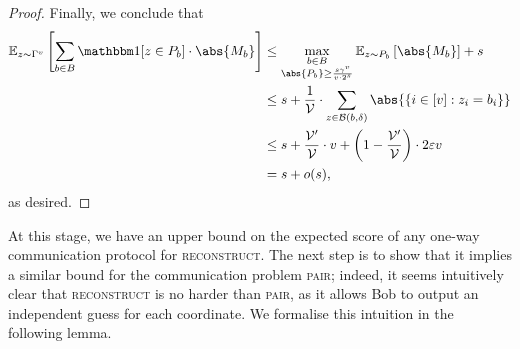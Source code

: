 \documentclass[10pt,a4paper]{article}
\theoremstyle{definition}
\newcommand{\E}{\mathbb E}
\renewcommand{\set}[1]{\left\{#1\right\}}
\newcommand{\eps}{\varepsilon}
\newcommand{\pair}{\normalfont\textsc{pair}\xspace}
\newcommand{\reconstruct}{\normalfont\textsc{reconstruct}\xspace}
\newcommand{\vcommitlength}{v}
\newcommand{\vcommitstring}{z}
\newcommand{\ball}{\mathcal B}
\newcommand{\alphabet}{\Gamma}
\newcommand{\alphabetsize}{\gamma}
\newcommand{\chf}{\mathbbm 1}
\begin{document}
\begin{proof}
    Finally, we conclude that
    \begin{align*}
        \E_{\vcommitstring \sim \alphabet^\vcommitlength}\left[\sum_{b \in B} \chf[\vcommitstring \in P_b] \cdot \abs{M_b}\right] &\leq \max_{\substack{b \in B\\\abs{P_b} \geq \frac{s \alphabetsize^\vcommitlength}{\vcommitlength \cdot 2^s}}} \E_{\vcommitstring \sim P_b}\left[\abs{M_b}\right] + s\\
        &\leq s + \frac1{\mathcal{V}} \cdot \sum_{\vcommitstring \in \ball(b, \delta)} \abs{\set{i \in [\vcommitlength] : \vcommitstring_i = b_i}}\\
        &\leq s +  \frac{\mathcal{V}'}{\mathcal{V}} \cdot \vcommitlength + \left(1 - \frac{\mathcal{V}'}{\mathcal{V}} \right) \cdot 2\eps \vcommitlength\\
        &= s + o(s),
    \end{align*}
    as desired.
\end{proof}

At this stage, we have an upper bound on the expected score of any one-way communication protocol for \reconstruct. The next step is to show that it implies a similar bound for the communication problem \pair; indeed, it seems intuitively clear that \reconstruct is no harder than \pair, as it allows Bob to output an independent guess for each coordinate. We formalise this intuition in the following lemma.
\end{document}
